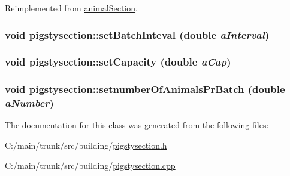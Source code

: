 Reimplemented from \hyperlink{classanimal_section_afe24791a22d2cbdb189332e1b468f059}{animalSection}.\hypertarget{classpigstysection_a9fa30c14febd9f8f73f22561fd0dbd7f}{
\subsubsection[{setBatchInteval}]{\setlength{\rightskip}{0pt plus 5cm}void pigstysection::setBatchInteval (double {\em aInterval})}}
\label{classpigstysection_a9fa30c14febd9f8f73f22561fd0dbd7f}
\hypertarget{classpigstysection_ab6c492cf471f7904afeea8cdf91221ad}{
\subsubsection[{setCapacity}]{\setlength{\rightskip}{0pt plus 5cm}void pigstysection::setCapacity (double {\em aCap})}}
\label{classpigstysection_ab6c492cf471f7904afeea8cdf91221ad}
\hypertarget{classpigstysection_a5a3773bf7e4def1e30e69740cbe66c9a}{
\subsubsection[{setnumberOfAnimalsPrBatch}]{\setlength{\rightskip}{0pt plus 5cm}void pigstysection::setnumberOfAnimalsPrBatch (double {\em aNumber})}}
\label{classpigstysection_a5a3773bf7e4def1e30e69740cbe66c9a}


The documentation for this class was generated from the following files:\begin{DoxyCompactItemize}
\item 
C:/main/trunk/src/building/\hyperlink{pigstysection_8h}{pigstysection.h}\item 
C:/main/trunk/src/building/\hyperlink{pigstysection_8cpp}{pigstysection.cpp}\end{DoxyCompactItemize}
